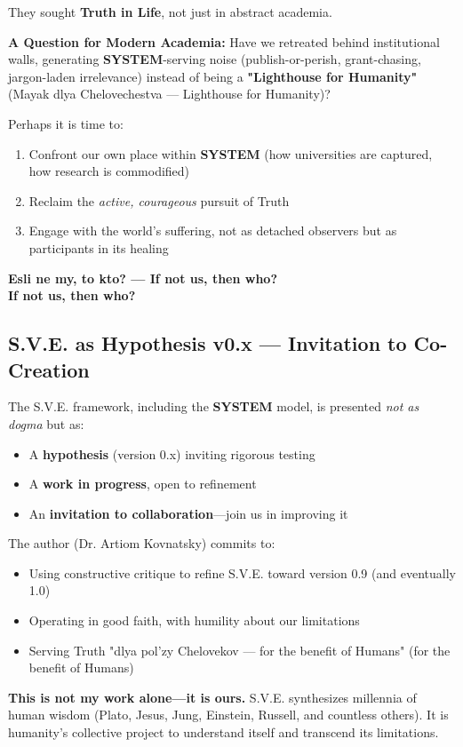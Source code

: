 \documentclass[11pt,a4paper]{article}
\newcommand{\SYSTEM}{\textbf{SYSTEM}}
\theoremstyle{definition}
\theoremstyle{remark}
\begin{document}
They sought \textbf{Truth in Life}, not just in abstract academia.

\textbf{A Question for Modern Academia:} Have we retreated behind institutional walls, generating \SYSTEM{}-serving noise (publish-or-perish, grant-chasing, jargon-laden irrelevance) instead of being a \textbf{"Lighthouse for Humanity"} (Mayak dlya Chelovechestva — Lighthouse for Humanity)?

Perhaps it is time to:
\begin{enumerate}
\item Confront our own place within \SYSTEM{} (how universities are captured, how research is commodified)
\item Reclaim the \textit{active, courageous} pursuit of Truth
\item Engage with the world's suffering, not as detached observers but as participants in its healing
\end{enumerate}

\textbf{Esli ne my, to kto? — If not us, then who?} \\
\textbf{If not us, then who?}

\subsection{S.V.E. as Hypothesis v0.x — Invitation to Co-Creation}

The S.V.E. framework, including the \SYSTEM{} model, is presented \textit{not as dogma} but as:
\begin{itemize}
\item A \textbf{hypothesis} (version 0.x) inviting rigorous testing
\item A \textbf{work in progress}, open to refinement
\item An \textbf{invitation to collaboration}—join us in improving it
\end{itemize}

The author (Dr. Artiom Kovnatsky) commits to:
\begin{itemize}
\item Using constructive critique to refine S.V.E. toward version 0.9 (and eventually 1.0)
\item Operating in good faith, with humility about our limitations
\item Serving Truth "dlya pol'zy Chelovekov — for the benefit of Humans" (for the benefit of Humans)
\end{itemize}

\textbf{This is not my work alone—it is ours.} S.V.E. synthesizes millennia of human wisdom (Plato, Jesus, Jung, Einstein, Russell, and countless others). It is humanity's collective project to understand itself and transcend its limitations.
\end{document}
